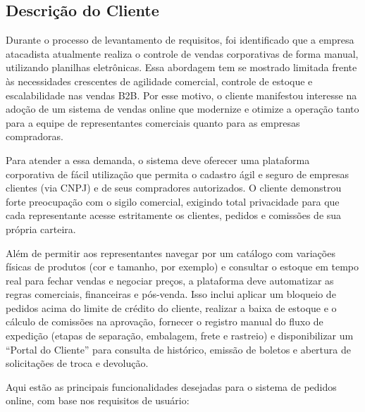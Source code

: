 \documentclass[12pt,a4paper]{article}
\begin{document}
\subsection{Descrição do Cliente}

Durante o processo de levantamento de requisitos, foi identificado que a empresa atacadista atualmente realiza o controle de vendas corporativas de forma manual, utilizando planilhas eletrônicas. Essa abordagem tem se mostrado limitada frente às necessidades crescentes de agilidade comercial, controle de estoque e escalabilidade nas vendas B2B. Por esse motivo, o cliente manifestou interesse na adoção de um sistema de vendas online que modernize e otimize a operação tanto para a equipe de representantes comerciais quanto para as empresas compradoras.

Para atender a essa demanda, o sistema deve oferecer uma plataforma corporativa de fácil utilização que permita o cadastro ágil e seguro de empresas clientes (via CNPJ) e de seus compradores autorizados. O cliente demonstrou forte preocupação com o sigilo comercial, exigindo total privacidade para que cada representante acesse estritamente os clientes, pedidos e comissões de sua própria carteira.

Além de permitir aos representantes navegar por um catálogo com variações físicas de produtos (cor e tamanho, por exemplo) e consultar o estoque em tempo real para fechar vendas e negociar preços, a plataforma deve automatizar as regras comerciais, financeiras e pós-venda. Isso inclui aplicar um bloqueio de pedidos acima do limite de crédito do cliente, realizar a baixa de estoque e o cálculo de comissões na aprovação, fornecer o registro manual do fluxo de expedição (etapas de separação, embalagem, frete e rastreio) e disponibilizar um ``Portal do Cliente'' para consulta de histórico, emissão de boletos e abertura de solicitações de troca e devolução.

Aqui estão as principais funcionalidades desejadas para o sistema de pedidos online, com base nos requisitos de usuário:
\end{document}

